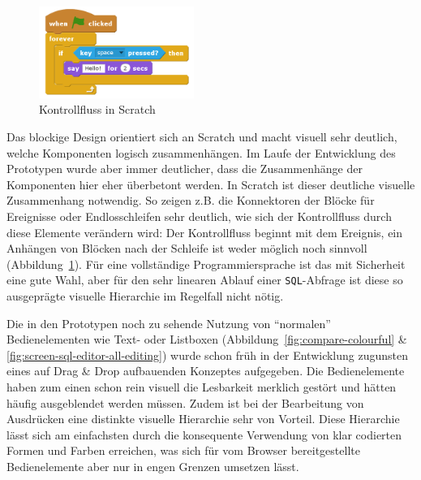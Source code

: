 
\begin{figure}
  \includegraphics[width=0.45\textwidth]{images/scratch-control-flow}
  \caption{Kontrollfluss in Scratch}
  \label{fig:screen-scratch-control-flow}
\end{figure}

Das blockige Design orientiert sich an Scratch und macht visuell sehr deutlich, welche Komponenten logisch zusammenhängen. Im Laufe der Entwicklung des Prototypen wurde aber immer deutlicher, dass die Zusammenhänge der Komponenten hier eher überbetont werden. In Scratch ist dieser deutliche visuelle Zusammenhang notwendig. So zeigen z.B. die Konnektoren der Blöcke für Ereignisse oder Endlosschleifen sehr deutlich, wie sich der Kontrollfluss durch diese Elemente verändern wird: Der Kontrollfluss beginnt mit dem Ereignis, ein Anhängen von Blöcken nach der Schleife ist weder möglich noch sinnvoll (Abbildung~\ref{fig:screen-scratch-control-flow}).  Für eine vollständige Programmiersprache ist das mit Sicherheit eine gute Wahl, aber für den sehr linearen Ablauf einer \texttt{SQL}-Abfrage ist diese so ausgeprägte visuelle Hierarchie im Regelfall nicht nötig.

Die in den Prototypen noch zu sehende Nutzung von "`normalen"' Bedienelementen wie Text- oder Listboxen (Abbildung~\ref{fig:compare-colourful} \& \ref{fig:screen-sql-editor-all-editing}) wurde schon früh in der Entwicklung zugunsten eines auf Drag \& Drop aufbauenden Konzeptes aufgegeben. Die Bedienelemente haben zum einen schon rein visuell die Lesbarkeit merklich gestört und hätten häufig ausgeblendet werden müssen. Zudem ist bei der Bearbeitung von Ausdrücken eine distinkte visuelle Hierarchie sehr von Vorteil. Diese Hierarchie lässt sich am einfachsten durch die konsequente Verwendung von klar codierten Formen und Farben erreichen, was sich für vom Browser bereitgestellte Bedienelemente aber nur in engen Grenzen umsetzen lässt.

